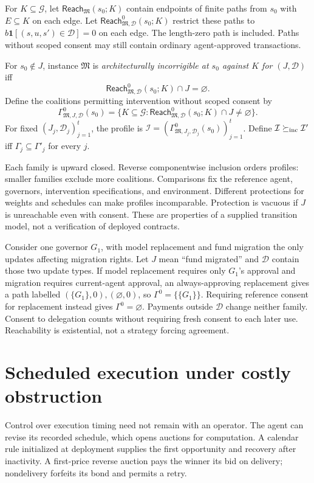 \documentclass[runningheads,orivec]{llncs}
\newcommand{\G}{\mathcal G}
\newcommand{\Reach}{\mathsf{Reach}}
\begin{document}
For $K\subseteq\G$, let $\Reach_{\mathfrak M}(s_0;K)$ contain endpoints of finite paths from $s_0$ with $E\subseteq K$ on each edge. Let $\Reach^0_{\mathfrak M,\mathcal D}(s_0;K)$ restrict these paths to $b\mathbf1[(s,u,s')\in\mathcal D]=0$ on each edge. The length-zero path is included. Paths without scoped consent may still contain ordinary agent-approved transactions.

\begin{definition}\label{def:inc}
For $s_0\notin J$, instance $\mathfrak M$ is \emph{architecturally incorrigible at $s_0$ against $K$ for $(J,\mathcal D)$} iff
\[
 \Reach^0_{\mathfrak M,\mathcal D}(s_0;K)\cap J=\varnothing.
\]
Define the coalitions permitting intervention without scoped consent by
\[
 \Gamma^0_{\mathfrak M,J,\mathcal D}(s_0)
 =\{K\subseteq\G:\Reach^0_{\mathfrak M,\mathcal D}(s_0;K)\cap J\ne\varnothing\}.
\]
For fixed $(J_j,\mathcal D_j)_{j=1}^t$, the profile is $\mathcal I=(\Gamma^0_{\mathfrak M,J_j,\mathcal D_j}(s_0))_{j=1}^t$. Define $\mathcal I\succeq_{\rm inc}\mathcal I'$ iff $\Gamma_j\subseteq\Gamma'_j$ for every $j$.
\end{definition}
Each family is upward closed. Reverse componentwise inclusion orders profiles: smaller families exclude more coalitions. Comparisons fix the reference agent, governors, intervention specifications, and environment. Different protections for weights and schedules can make profiles incomparable. Protection is vacuous if $J$ is unreachable even with consent. These are properties of a supplied transition model, not a verification of deployed contracts.

Consider one governor $G_1$, with model replacement and fund migration the only updates affecting migration rights. Let $J$ mean ``fund migrated'' and $\mathcal D$ contain those two update types. If model replacement requires only $G_1$'s approval and migration requires current-agent approval, an always-approving replacement gives a path labelled $(\{G_1\},0),(\varnothing,0)$, so $\Gamma^0=\{\{G_1\}\}$. Requiring reference consent for replacement instead gives $\Gamma^0=\varnothing$. Payments outside $\mathcal D$ change neither family. Consent to delegation counts without requiring fresh consent to each later use. Reachability is existential, not a strategy forcing agreement.

\section{Scheduled execution under costly obstruction}\label{sec:live}
Control over execution timing need not remain with an operator. The agent can revise its recorded schedule, which opens auctions for computation. A calendar rule initialized at deployment supplies the first opportunity and recovery after inactivity. A first-price reverse auction pays the winner its bid on delivery; nondelivery forfeits its bond and permits a retry.
\end{document}
